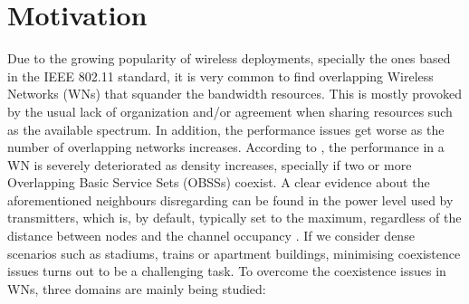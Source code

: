 \documentclass[12pt, a4paper,twoside]{tesi_upf}
\begin{document}
		\section{Motivation}
		\label{section:motivation}
			Due to the growing popularity of wireless deployments, specially the ones based in the IEEE 802.11 standard, it is very common to find overlapping Wireless Networks (WNs) that squander the bandwidth resources. This is mostly provoked by the usual lack of organization and/or agreement when sharing resources such as the available spectrum. In addition, the performance issues get worse as the number of overlapping networks increases. According to \cite{zhong2015issues}, the performance in a WN is severely deteriorated as density increases, specially if two or more Overlapping Basic Service Sets (OBSSs) coexist. A clear evidence about the aforementioned neighbours disregarding can be found in the power level used by transmitters, which is, by default, typically set to the maximum, regardless of the distance between nodes and the channel occupancy \cite{akella2007self}. If we consider dense scenarios such as stadiums, trains or apartment buildings, minimising coexistence issues turns out to be a challenging task. To overcome the coexistence issues in WNs, three domains are mainly being studied:
\end{document}
